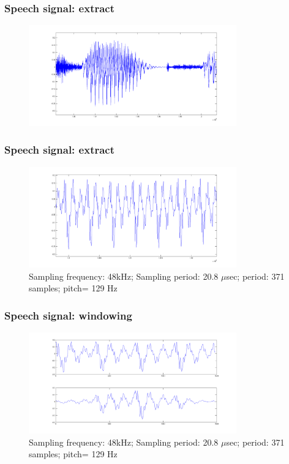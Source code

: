 \begin{frame}
\frametitle{Speech signal: extract}
\begin{figure}
  \centering
  \includegraphics[width=0.8\textwidth]{speech-extract}
\end{figure}
\end{frame}


\begin{frame}
\frametitle{Speech signal: extract}
\begin{figure}
  \centering
  \includegraphics[width=0.8\textwidth]{speech-extract-1}
  \caption{Sampling frequency: 48kHz; Sampling period: 20.8 $\mu$sec; period: 371 samples; pitch= 129 Hz }
\end{figure}
\end{frame}


\begin{frame}
\frametitle{Speech signal: windowing}
\begin{figure}
  \centering
  \includegraphics[width=0.8\textwidth]{speech-extract-windowed}
  \caption{Sampling frequency: 48kHz; Sampling period: 20.8 $\mu$sec; period: 371 samples; pitch= 129 Hz }
\end{figure}
\end{frame}


